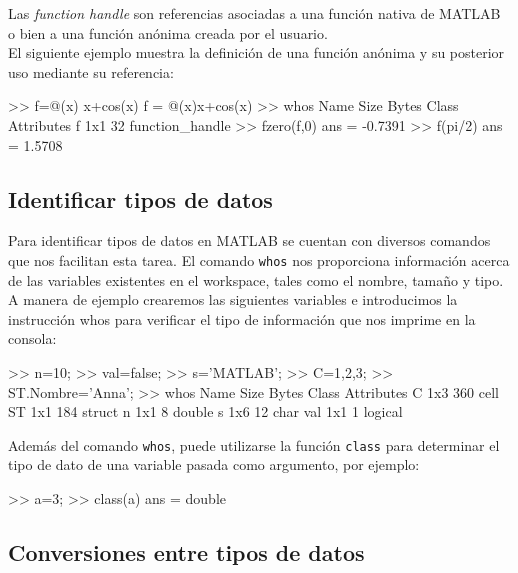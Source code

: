 Las \emph{function handle} son referencias asociadas a una función
nativa de MATLAB o bien a una función anónima creada por el usuario.\\

El siguiente ejemplo muestra la definición de una función anónima y su
posterior uso mediante su referencia:

\begin{matlab}
>> f=@(x) x+cos(x)
f = 
    @(x)x+cos(x)
>> whos
  Name      Size            Bytes  Class              Attributes
  f         1x1                32  function_handle              
>> fzero(f,0) %
ans =
   -0.7391
>> f(pi/2) %
ans =
    1.5708
\end{matlab}

\subsection{Identificar tipos de datos}

Para identificar tipos de datos en MATLAB se cuentan con diversos
comandos que nos facilitan esta tarea. El comando \texttt{whos} nos
proporciona información acerca de las variables existentes en el
workspace, tales como el nombre, tamaño y tipo. A manera de ejemplo
crearemos las siguientes variables e introducimos la instrucción whos
para verificar el tipo de información que nos imprime en la consola:

\begin{matlab}
>> n=10;
>> val=false;
>> s='MATLAB';
>> C={1,2,3};
>> ST.Nombre='Anna';
>> whos
  Name      Size            Bytes  Class      Attributes
  C         1x3               360  cell                 
  ST        1x1               184  struct               
  n         1x1                 8  double               
  s         1x6                12  char                 
  val       1x1                 1  logical      
 
\end{matlab}

Además del comando \texttt{whos}, puede utilizarse la función
\texttt{class} para determinar el tipo de dato de una variable pasada
como argumento, por ejemplo:

\begin{matlab}
>> a=3;
>> class(a)
ans =
double
\end{matlab}

\subsection{Conversiones entre tipos de datos}

